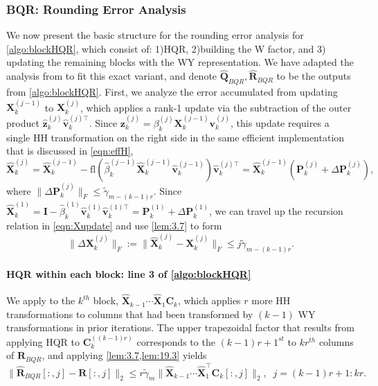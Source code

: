 \documentclass[review,onefignum,onetabnum]{siamart190516}
\newcommand{\bb}[1]{\mathbf{#1}}
\newcommand{\fl}{\mathrm{fl}}
\begin{document}
\subsubsection{BQR: Rounding Error Analysis}\label{sec:BQRerr}
We now present the basic structure for the rounding error analysis for \cref{algo:blockHQR}, which consist of: 1)HQR, 2)building the W factor, and 3) updating the remaining blocks with the WY representation.
We have adapted the analysis from \cite{Higham2002} to fit this exact variant, and denote $\hat{\bb{Q}}_{BQR},\hat{\bb{R}}_{BQR}$ to be the outputs from \cref{algo:blockHQR}.
First, we analyze the error accumulated from updating $\bb{X}_k^{(j-1)}$ to $\bb{X}_k^{(j)}$, which applies a rank-1 update via the subtraction of the outer product $\hat{\bb{z}}_{k}^{(j)}\hat{\bb{v}}_{k}^{(j)\top}$.
Since $\bb{z}_{k}^{(j)} = \beta_k^{(j)}\bb{X}_{k}^{(j-1)}\bb{v}_{k}^{(j)}$, this update requires a single HH transformation on the right side in the same efficient implementation that is discussed in \cref{eqn:effH},
\begin{equation}
\hat{\bb{X}}_k^{(j)} = \hat{\bb{X}}_k^{(j-1)} - \fl(\hat{\beta}_k^{(j-1)}\hat{\bb{X}}_k^{(j-1)}\hat{\bb{v}}_k^{(j-1)})\hat{\bb{v}}_k^{(j)\top} = \hat{\bb{X}}_k^{(j-1)}(\bb{P}_k^{(j)}+\Delta \bb{P}_k^{(j)}), \label{eqn:Xupdate}
\end{equation}
where $\|\Delta \bb{P}_k^{(j)}\|_F \leq \tilde{\gamma}_{m-(k-1)r}$.
Since $\hat{\bb{X}}_k^{(1)} = \bb{I} - \hat{\beta}_k^{(1)}\hat{\bb{v}}_k^{(1)}\hat{\bb{v}}_k^{(1)\top} = \bb{P}_k^{(1)} + \Delta \bb{P}_k^{(1)}$, we can travel up the recursion relation in \cref{eqn:Xupdate} and use \cref{lem:3.7} to form
\begin{equation}
	\|\Delta \bb{X}_k^{(j)} \|_F := \|\hat{\bb{X}}_k^{(j)}-\bb{X}_k^{(j)}\|_F \leq j\tilde{\gamma}_{m-(k-1)r}. \label{eqn:deltX}
\end{equation}

\paragraph{HQR within each block: line 3 of \cref{algo:blockHQR}}
We apply  to the $k^{th}$ block, $\hat{\bb{X}}_{k-1}\cdots\hat{\bb{X}}_1\bb{C}_k$, which applies $r$ more HH transformations to columns that had been transformed by $(k-1)$ WY transformations in prior iterations.
The upper trapezoidal factor that results from applying HQR to $\bb{C}_{k}^{((k-1)r)}$ corresponds to the $(k-1)r+1^{st}$ to $kr^{th}$ columns of $\hat{\bb{R}}_{BQR}$, and applying \cref{lem:3.7,lem:19.3} yields
\begin{equation*}
	\|\hat{\bb{R}}_{BQR}[:,j]-\bb{R}[:,j]\|_2 \leq r\tilde{\gamma}_{m}\|\hat{\bb{X}}_{k-1}\cdots\hat{\bb{X}}_1^{\top}\bb{C}_k[:,j]\|_2,\;\; j=(k-1)r+1:kr.%
\end{equation*}
\end{document}
